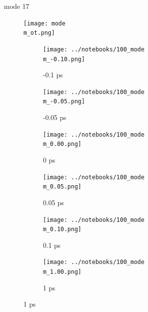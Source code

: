 \documentclass{beamer}
\newcommand\w{0.32}
\begin{document}
\renewcommand\m{17}
\begin{frame}{mode \m}
				\vspace{\vh mm}
	\begin{figure}
		\centering
		\texttt{[image: mode\\m\_ot.png]}
	\end{figure}
	\begin{figure}
		\centering
		\begin{subfigure}[b]{\w\textwidth}
			\centering
			\texttt{[image: ../notebooks/100\_mode\\m\_-0.10.png]}
			\caption{-0.1 ps}
		\end{subfigure}
		\begin{subfigure}[b]{\w\textwidth}
			\centering
			\texttt{[image: ../notebooks/100\_mode\\m\_-0.05.png]}
			\caption{-0.05 ps}
		\end{subfigure}
		\begin{subfigure}[b]{\w\textwidth}
			\centering
			\texttt{[image: ../notebooks/100\_mode\\m\_0.00.png]}
			\caption{0 ps}
		\end{subfigure}
		\begin{subfigure}[b]{\w\textwidth}
			\centering
			\texttt{[image: ../notebooks/100\_mode\\m\_0.05.png]}
			\caption{0.05 ps}
		\end{subfigure}
		\begin{subfigure}[b]{\w\textwidth}
			\centering
			\texttt{[image: ../notebooks/100\_mode\\m\_0.10.png]}
			\caption{0.1 ps}
		\end{subfigure}
		\begin{subfigure}[b]{\w\textwidth}
			\centering
			\texttt{[image: ../notebooks/100\_mode\\m\_1.00.png]}
			\caption{1 ps}
		\end{subfigure}
	\end{figure}
\end{frame}
\end{document}
